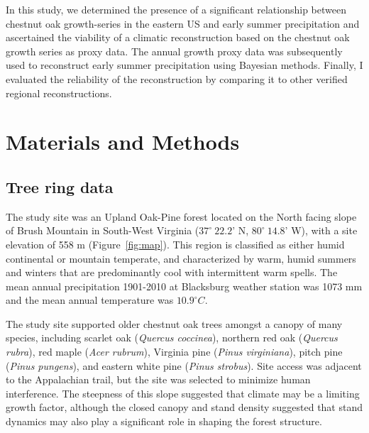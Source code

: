 In this study, we determined the presence of a significant relationship between chestnut oak growth-series in the eastern US and early summer precipitation and ascertained the viability of a climatic reconstruction based on the chestnut oak growth series as proxy data. The annual growth proxy data was subsequently used to reconstruct early summer precipitation using Bayesian methods. Finally, I evaluated the reliability of the reconstruction by comparing it to other verified regional reconstructions.  

\section{Materials and Methods}
\label{sec:meth}

\subsection{Tree ring data}

The study site was an Upland Oak-Pine forest located on the North facing slope of Brush Mountain in South-West Virginia  ($37^{\circ} \ 22.2$' N, $80^{\circ}\ 14.8$' W), with a site elevation of 558 m (Figure~\ref{fig:map}). This region is classified as either humid continental or mountain temperate, and characterized by warm, humid summers and winters that are predominantly cool with intermittent warm spells. The mean annual precipitation 1901-2010 at Blacksburg weather station was 1073 mm and the mean annual temperature was $10.9^{\circ} C$. 

The study site supported older chestnut oak trees amongst a canopy of many species, including scarlet oak (\textit{Quercus coccinea}), northern red oak (\textit{Quercus rubra}), red maple (\textit{Acer rubrum}), Virginia pine (\textit{Pinus virginiana}), pitch pine (\textit{Pinus pungens}), and eastern white pine (\textit{Pinus strobus}). Site access was adjacent to the Appalachian trail, but the site was selected to minimize human interference. The steepness of this slope suggested that climate may be a limiting growth factor, although the closed canopy and stand density suggested that stand dynamics may also play a significant role in shaping the forest structure.

